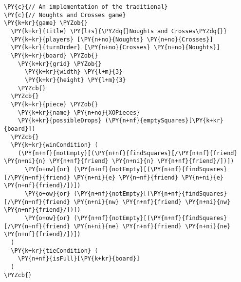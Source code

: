 \begin{Verbatim}[commandchars=\\\{\}]
\PY{c}{// An implementation of the traditional}
\PY{c}{// Noughts and Crosses game}
\PY{k+kr}{game} \PYZob{}
  \PY{k+kr}{title} \PY{l+s}{\PYZdq{}Noughts and Crosses\PYZdq{}}
  \PY{k+kr}{players} [\PY{n+no}{Noughts} \PY{n+no}{Crosses}]
  \PY{k+kr}{turnOrder} [\PY{n+no}{Crosses} \PY{n+no}{Noughts}]
  \PY{k+kr}{board} \PYZob{}
    \PY{k+kr}{grid} \PYZob{}
      \PY{k+kr}{width} \PY{l+m}{3}
      \PY{k+kr}{height} \PY{l+m}{3}
    \PYZcb{}
  \PYZcb{}
  \PY{k+kr}{piece} \PYZob{}
    \PY{k+kr}{name} \PY{n+no}{XOPieces}
    \PY{k+kr}{possibleDrops} (\PY{n+nf}{emptySquares}[\PY{k+kr}{board}])
  \PYZcb{}
  \PY{k+kr}{winCondition} (
    (\PY{n+nf}{notEmpty}[(\PY{n+nf}{findSquares}[/\PY{n+nf}{friend} \PY{n+ni}{n} \PY{n+nf}{friend} \PY{n+ni}{n} \PY{n+nf}{friend}/])])
      \PY{o+ow}{or} (\PY{n+nf}{notEmpty}[(\PY{n+nf}{findSquares}[/\PY{n+nf}{friend} \PY{n+ni}{e} \PY{n+nf}{friend} \PY{n+ni}{e} \PY{n+nf}{friend}/])])
      \PY{o+ow}{or} (\PY{n+nf}{notEmpty}[(\PY{n+nf}{findSquares}[/\PY{n+nf}{friend} \PY{n+ni}{nw} \PY{n+nf}{friend} \PY{n+ni}{nw} \PY{n+nf}{friend}/])])
      \PY{o+ow}{or} (\PY{n+nf}{notEmpty}[(\PY{n+nf}{findSquares}[/\PY{n+nf}{friend} \PY{n+ni}{ne} \PY{n+nf}{friend} \PY{n+ni}{ne} \PY{n+nf}{friend}/])])
  )
  \PY{k+kr}{tieCondition} (
    \PY{n+nf}{isFull}[\PY{k+kr}{board}]
  )
\PYZcb{}
\end{Verbatim}
